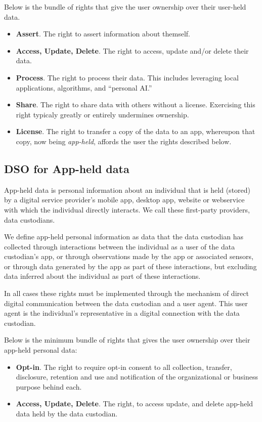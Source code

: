 \documentclass[11pt, oneside]{article}   	%
\begin{document}
Below is the bundle of rights that give the user ownership over their user-held data. 
\begin{itemize}
	\item \textbf{Assert}. The right to assert information about themself.
	\item \textbf{Access, Update, Delete}. The right to access, update and/or delete their data. 
	\item \textbf{Process}. The right to process their data. This includes leveraging local applications, algorithms, and ``personal AI.'' 
	\item \textbf{Share}. The right to share data with others without a license. Exercising this right typicaly greatly or entirely undermines ownership.
	\item \textbf{License}. The right to transfer a copy of the data to an app, whereupon that copy, now being \emph{app-held}, affords the user the rights described below.
\end{itemize}

\subsection{DSO for App-held data}
App-held data is personal information about an individual that is held (stored) by a digital service provider's mobile app, desktop app, website or webservice with which the individual directly interacts. We call these first-party providers, data custodians.

We define app-held personal information as data that the data custodian has collected through interactions between the individual as a user of the data custodian's app, or through observations made by the app or associated sensors, or through data generated by the app as part of these interactions, but excluding data inferred about the individual as part of these interactions.

In all cases these rights must be implemented through the mechanism of direct digital communication between the data custodian and a user agent. This user agent is the individual's representative in a digital connection with the data custodian.

Below is the minimum bundle of rights that gives the user ownership over their app-held personal data:
\begin{itemize}
	\item \textbf{Opt-in}. The right to require opt-in consent to all collection, transfer, disclosure, retention and use and notification of the organizational or business purpose behind each.
	\item \textbf{Access, Update, Delete}. The right, to access update, and delete app-held data held by the data custodian. 
\end{itemize}
\end{document}
